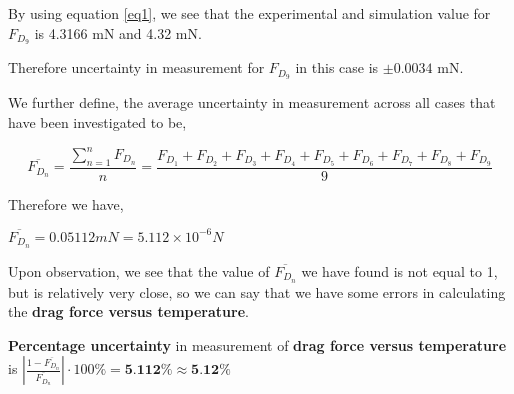 	{By using equation \ref{eq1}, we see that the experimental and simulation value for $F_{D_9}$ is 4.3166 mN and 4.32 mN.}
        
	{Therefore uncertainty in measurement for $F_{D_9}$ in this case is $\pm{\textit{0.0034}}$ mN.}
        

        

        




{We further define, the average uncertainty in measurement across all cases that have been investigated to be,} 

    $$\overline{F_{D_n}} = \frac{\sum_{n=1}^{n}F_{D_n}}{n} = \frac{F_{D_1} + F_{D_2} + F_{D_3} + F_{D_4} + F_{D_5} + F_{D_6} + F_{D_7} + F_{D_8} + F_{D_9}}{9}$$

{Therefore we have,}

    $\overline{F_{D_n}} = 0.05112 mN = 5.112\times 10^{-6} N$

{Upon observation, we see that the value of $\overline{F_{D_n}}$ we have found is not equal to 1, but is relatively very close, so we can say that we have some errors in calculating the \textbf{drag force versus temperature}.}
        
        {\textbf{Percentage uncertainty} in measurement of \textbf{drag force versus temperature} is $\left|\frac{1-\overline{F_{D_n}}}{\overline{F_{D_n}}}\right|\cdot{100\%} = \textbf{5.112\%} \approx \textbf{5.12\%}$}
        




